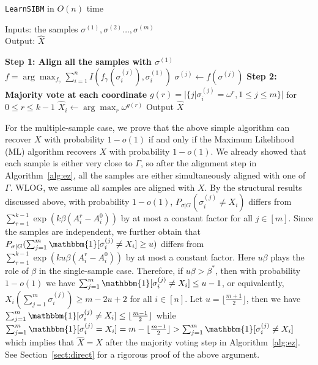 \documentclass{article}
\begin{document}
\begin{center}
	\begin{minipage}{.55\textwidth}
		\begin{algorithm}[H]
			\caption{\texttt{LearnSIBM} in $O(n)$ time} \label{alg:ez}
			Inputs: the samples $\sigma^{(1)},\sigma^{(2)}\dots,\sigma^{(m)}$ \\
			Output: $\hat{X}$
			\begin{algorithmic}[1]
				\Statex \hspace*{-0.3in} 
				{\bf Step 1: Align all the samples with $\sigma^{(1)}$ }
				\State $f=\arg\max_{f_{\gamma}} \sum_{i=1}^n I(f_{\gamma}(\sigma^{(j)}_i), \sigma^{(1)}_i)$
				\State $\sigma^{(j)} \gets f(\sigma^{(j)})$
				\EndFor
				\Statex \hspace*{-0.3in}
				{\bf Step 2: Majority vote at each coordinate}
				\State $g(r) = |\{j | \sigma^{(j)}_i = \omega^r,1\leq j \leq m\}|$ for $ 0 \leq r \leq k-1$
				\State $\hat{X}_i \gets  \arg\max_r \omega^{g(r)}$
				\State {}
				\EndFor
				\State Output $\hat{X}$
			\end{algorithmic}
		\end{algorithm}
	\end{minipage}
\end{center}
For the multiple-sample case, we prove that the above simple algorithm can recover $X$ with probability $1-o(1)$ if and only if the Maximum Likelihood (ML) algorithm recovers $X$ with probability $1-o(1)$. We already showed that each sample is either very close to $\Gamma$, so after the alignment step in Algorithm~\ref{alg:ez}, all the samples are either simultaneously aligned with one of $\Gamma$. WLOG, we assume all samples are aligned with $X$.
By the structural results discussed above, with probability $1-o(1)$, $P_{\sigma|G}(\sigma_i^{(j)} \neq X_i)$ differs from $\sum_{r=1}^{k-1} \exp (k \beta (A^r_i-A^0_i))$ by at most a constant factor for all $j\in[m]$. Since the samples are independent, we further obtain that $P_{\sigma|G}(\sum_{j=1}^m\mathbbm{1}[\sigma_i^{(j)} \neq X_i]\ge u)$ differs from $\sum_{r=1}^{k-1} \exp (k u \beta (A^r_i-A^0_i))$
by at most a constant factor.
Here $u\beta$ plays the role of $\beta$ in the single-sample case.
Therefore, if $u\beta>\beta^\ast$, then with probability $1-o(1)$ we have $\sum_{j=1}^m\mathbbm{1}[\sigma_i^{(j)} \neq X_i] \le u-1$, or equivalently, $X_i(\sum_{j=1}^m \sigma_i^{(j)} ) \ge m-2u+2$ for all $i\in[n]$. Let $u=\lfloor \frac{m+1}{2} \rfloor$,
then we have $\sum_{j=1}^m\mathbbm{1}[\sigma_i^{(j)} \neq X_i] \le \lfloor \frac{m-1}{2} \rfloor $ while $\sum_{j=1}^m\mathbbm{1}[\sigma_i^{(j)} = X_i]
= m - \lfloor \frac{m-1}{2} \rfloor > \sum_{j=1}^m\mathbbm{1}[\sigma_i^{(j)} \neq X_i] $
which implies that $\hat{X}=X$ after the majority voting step in Algorithm~\ref{alg:ez}. See Section~\ref{sect:direct} for a rigorous proof of the above argument.
\end{document}

